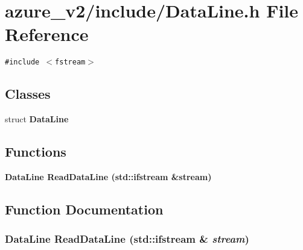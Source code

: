 \section{azure\_\-v2/include/Data\-Line.h File Reference}
\label{DataLine_8h}
{\tt \#include $<$fstream$>$}\par
\subsection*{Classes}
\begin{CompactItemize}
\item 
struct \bf{Data\-Line}
\end{CompactItemize}
\subsection*{Functions}
\begin{CompactItemize}
\item 
\bf{Data\-Line} \bf{Read\-Data\-Line} (std::ifstream \&stream)
\end{CompactItemize}


\subsection{Function Documentation}
\subsubsection{\setlength{\rightskip}{0pt plus 5cm}\bf{Data\-Line} Read\-Data\-Line (std::ifstream \& {\em stream})}\label{DataLine_8h_26dd28767854336a9d45ae7dea6a58db}



